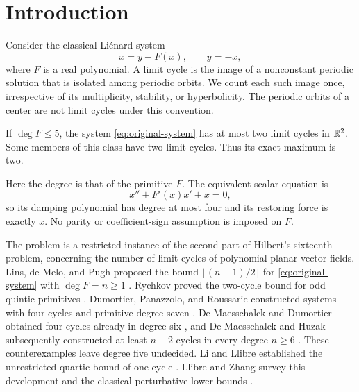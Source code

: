 \section{Introduction}\label{sec:introduction}

Consider the classical Li\'enard system
\begin{equation}\label{eq:original-system}
 \dot x=y-F(x),\qquad \dot y=-x,
\end{equation}
where $F$ is a real polynomial. A limit cycle is the image of a
nonconstant periodic solution that is isolated among periodic
orbits. We count each such image once, irrespective of its
multiplicity, stability, or hyperbolicity. The periodic orbits of
a center are not limit cycles under this convention.

\begin{theorem}\label{thm:main}
If $\deg F\le5$, the system \eqref{eq:original-system} has at most
two limit cycles in $\mathbb R^2$. Some members of this class have two
limit cycles. Thus its exact maximum is two.
\end{theorem}

Here the degree is that of the primitive $F$. The equivalent scalar
equation is
\[
 x''+F'(x)x'+x=0,
\]
so its damping polynomial has degree at most four and its restoring
force is exactly $x$. No parity or coefficient-sign assumption is
imposed on $F$.

The problem is a restricted instance of the second part of
Hilbert's sixteenth problem, concerning the number of limit cycles
of polynomial planar vector fields. Lins, de Melo, and Pugh proposed
the bound $\lfloor(n-1)/2\rfloor$ for
\eqref{eq:original-system} with $\deg F=n\ge1$ \cite{LMP}.
Rychkov proved the two-cycle bound for odd quintic primitives
\cite{Rychkov}. Dumortier, Panazzolo, and Roussarie constructed systems with
four cycles and primitive degree seven \cite{DPR}.
De Maesschalck and Dumortier obtained four cycles already in
degree six \cite{DMD}, and De Maesschalck and Huzak subsequently
constructed at least $n-2$ cycles in every degree $n\ge6$
\cite{DMH}. These counterexamples leave degree five undecided.
Li and Llibre established the unrestricted quartic bound of one
cycle \cite{LiLlibre}. Llibre and Zhang survey this development
and the classical perturbative lower bounds \cite{LlibreZhang}.

